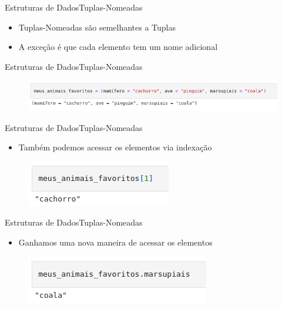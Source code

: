 \documentclass{beamer}
\begin{document}
\begin{frame}{Estruturas de Dados}{Tuplas-Nomeadas}
    \begin{itemize}
        \item Tuplas-Nomeadas são semelhantes a Tuplas 
        \item A exceção é que cada elemento tem um nome adicional
    \end{itemize}
\end{frame}

\begin{frame}{Estruturas de Dados}{Tuplas-Nomeadas}
    \begin{figure}
        \centering
        \includegraphics[scale=0.4]{imagens/tuplas-nomeadas01.png}
        \label{fig:my_label}
    \end{figure}
\end{frame}

\begin{frame}{Estruturas de Dados}{Tuplas-Nomeadas}
    \begin{itemize}
        \item Também podemos acessar os elementos via indexação
    \end{itemize}
    \begin{figure}
        \centering
        \includegraphics[scale=0.5]{imagens/tuplas-nomeadas02.png}
        \label{fig:my_label}
    \end{figure}
\end{frame}

\begin{frame}{Estruturas de Dados}{Tuplas-Nomeadas}
    \begin{itemize}
        \item Ganhamos uma nova maneira de acessar os elementos
    \end{itemize}
    \begin{figure}
        \centering
        \includegraphics[scale=0.5]{imagens/tuplas-nomeadas03.png}
        \label{fig:my_label}
    \end{figure}
\end{frame}
\end{document}
